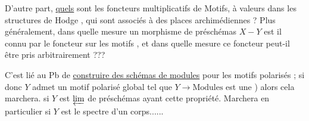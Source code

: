 
D'autre part, \uline{quels} sont les foncteurs multiplicatifs de Motifs, à valeurs dans les structures de Hodge , qui sont associés à des places archimédiennes ? Plus généralement, dans quelle mesure un morphisme de préschémas $X\mathbin{-}Y$ est il connu par le foncteur sur les motifs , et dans quelle mesure ce foncteur  peut-il être pris arbitrairement ???

C'est lié au Pb de \uline{construire des schémas de modules} pour les motifs polarisés ; si donc $Y$ admet un motif polarisé global tel que $Y\to\text{Modules}$ est une  )  alors cela marchera.  si $Y$ est $\varprojlim$ de préschémas ayant cette  propriété. Marchera en particulier si $Y$ est le spectre d'un corps......

